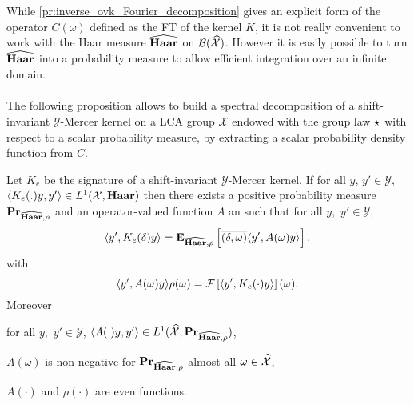 While \cref{pr:inverse_ovk_Fourier_decomposition} gives an explicit form of the operator $C(\omega)$ defined as the \acl{FT} of the kernel $K$, it is not really convenient to work with the Haar measure $\widehat{\mathbf{Haar}}$ on $\mathcal{B}(\widehat{\mathcal{X}})$. However it is easily possible to turn $\widehat{\mathbf{Haar}}$ into a probability measure to allow efficient integration over an infinite domain.
\paragraph{}
The following proposition allows to build a spectral decomposition of a shift-invariant $\mathcal{Y}$-Mercer kernel on a \acs{LCA} group $\mathcal{X}$ endowed with the group law $\star$ with respect to a scalar probability measure, by extracting a scalar probability density function from $C$.
\begin{proposition}
\label{pr:spectral}
Let $K_e$ be the signature of a shift-invariant $\mathcal{Y}$-Mercer kernel. If for all $y$, $y' \in\mathcal{Y}$, $\langle K_e(.)y,y'\rangle\in L^1(\mathcal{X},\mathbf{Haar})$ then there exists a positive probability measure ${\mathbf{{Pr}}}_{\widehat{\mathbf{Haar}},\rho}$ and an operator-valued function $A$ an such that for all $y,$ $y'\in\mathcal{Y}$,
\begin{dmath}
\label{eq:expectation_spec}
\inner{y', K_e(\delta)y}
=\expectation_{\dual{\Haar},\rho}\left[\conj{\pairing{\delta, \omega}}\inner{y', A(\omega)y}\right],
\end{dmath}
with
\begin{dmath}
\label{eq:comega}
\inner{y', A(\omega)y}\rho(\omega) = \FT{\inner{y', K_e(\cdot)y}}(\omega).
\end{dmath}
Moreover
\begin{propenum}
\item for all $y,$ $y'\in\mathcal{Y}$, $\langle A(.)y,y'\rangle\in L^1(\widehat{\mathcal{X}}, {\mathbf{{Pr}}}_{\widehat{\mathbf{Haar}},\rho})$,
\item $A(\omega)$ is non-negative for ${\mathbf{{Pr}}}_{\widehat{\mathbf{Haar}},\rho}$-almost all $\omega\in\widehat{\mathcal{X}}$,
\item $A(\cdot)$ and $\rho(\cdot)$ are even functions.
\end{propenum}
\end{proposition}
